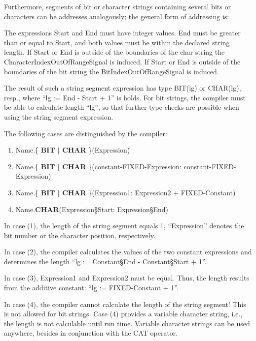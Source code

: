 Furthermore, segments of bit or character strings containing several
bits or characters can be addresses analogously; the general form of
addressing is:




The expressions Start and End must have integer values. End must be
greater than or equal to Start, and both values must be within the
declared string length.
If Start or End is outside of the boundaries of  the char string
the CharacterIndexOutOfRangeSignal is induced.
If Start or End is outside of the boundaries of  the bit string
the BitIndexOutOfRangeSignal is induced.

The result of such a string segment expression has type BIT(lg) or
CHAR(lg), resp., where ``lg := End - Start + 1'' is holds. For bit
strings, the compiler must be able to calculate length ``lg'', so that
further type checks are possible when using the string segment
expression.

The following cases are distinguished by the compiler:
\begin{enumerate}
\item Name.\{ {\bf BIT $\mid$ CHAR} \}(Expression)
\item Name.\{ {\bf BIT $\mid$ CHAR} \}(constant-FIXED-Expression: constant-FIXED-Expression)
\item Name.\{ {\bf BIT $\mid$ CHAR} \}(Expression1: Expression2 + FIXED-Constant)
\item Name.{\bf CHAR}(Expression\S Start: Expression\S End)
\end{enumerate}

In case (1), the length of the string segment equals 1, ``Expression''
denotes the bit number or the character position, respectively.

In case (2), the compiler calculates the values of the two constant
expressions and determines the length ``lg := Constant\S End -
Constant\S Start + 1''.

In case (3), Expression1 and Expression2 must be equal. Thus, the length
results from the additive constant: ``lg := FIXED-Constant + 1''.

In case (4), the compiler cannot calculate the length of the string
segment! This is not allowed for bit strings. Case (4) provides a
variable character string, i.e., the length is not calculable until run
time. Variable character strings can be used anywhere, besides in
conjunction with the CAT operator.


